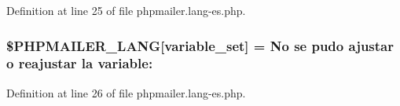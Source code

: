 Definition at line 25 of file phpmailer.\+lang-\/es.\+php.

\subsubsection[{\texorpdfstring{\$\+P\+H\+P\+M\+A\+I\+L\+E\+R\+\_\+\+L\+A\+NG}{$PHPMAILER_LANG}}]{\setlength{\rightskip}{0pt plus 5cm}\$P\+H\+P\+M\+A\+I\+L\+E\+R\+\_\+\+L\+A\+NG\mbox{[}\textquotesingle{}variable\+\_\+set\textquotesingle{}\mbox{]} = \textquotesingle{}No se pudo ajustar {\bf o} reajustar la variable\+: \textquotesingle{}}\hypertarget{phpmailer_8lang-es_8php_af795debc7a739d038742691c358d9032}{}\label{phpmailer_8lang-es_8php_af795debc7a739d038742691c358d9032}


Definition at line 26 of file phpmailer.\+lang-\/es.\+php.

